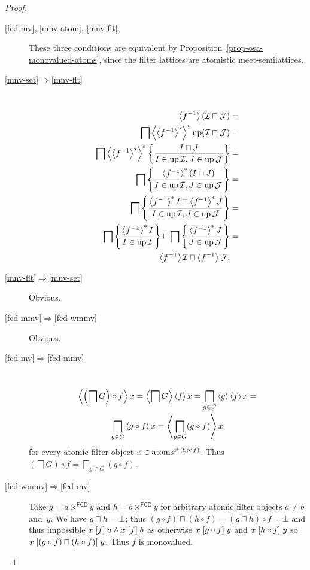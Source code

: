 \begin{proof}
~
\begin{description}
\item[\ref{fcd-mv}, \ref{mnv-atom}, \ref{mnv-flt}]
These three conditions are equivalent by
Proposition~\ref{prop-osa-monovalued-atoms}, since the filter
lattices are atomistic meet-semilattices.
\item [{\ref{mnv-set}$\Rightarrow$\ref{mnv-flt}}] ~
\begin{align*}
\left\langle f^{-1}\right\rangle(\mathcal{I}\sqcap\mathcal{J}) & =\\
\bigsqcap\left\langle \left\langle f^{-1}\right\rangle ^{\ast}\right\rangle ^{\ast}\operatorname{up}(\mathcal{I}\sqcap\mathcal{J}) & =\\
\bigsqcap\left\langle \left\langle f^{-1}\right\rangle ^{\ast}\right\rangle ^{\ast}\left\{ \frac{I\sqcap
J}{I\in\operatorname{up}\mathcal{I},J\in\operatorname{up}\mathcal{J}}\right\} & =\\
\bigsqcap\left\{ \frac{\left\langle f^{-1}\right\rangle ^{\ast}(I\sqcap J)}{I\in\operatorname{up}\mathcal{I},J\in\operatorname{up}\mathcal{J}}\right\}
& =\\
\bigsqcap\left\{ \frac{\left\langle f^{-1}\right\rangle ^{\ast}I\sqcap\left\langle f^{-1}\right\rangle ^{\ast}J}{I\in\operatorname{up}\mathcal{I},J\in\operatorname{up}\mathcal{J}}\right\} & =\\
\bigsqcap\left\{ \frac{\left\langle f^{-1}\right\rangle ^{\ast}I}{I\in\operatorname{up}\mathcal{I}}\right\}\sqcap\bigsqcap\left\{ \frac{\left\langle f^{-1}\right\rangle ^{\ast}J}{J\in\operatorname{up}\mathcal{J}}\right\}
& =\\
\left\langle f^{-1}\right\rangle\mathcal{I}\sqcap\left\langle f^{-1}\right\rangle\mathcal{J}.
\end{align*}

\item [{\ref{mnv-flt}$\Rightarrow$\ref{mnv-set}}] Obvious.
\item [{\ref{fcd-mmv}$\Rightarrow$\ref{fcd-wmmv}}] Obvious.
\item [{\ref{fcd-mv}$\Rightarrow$\ref{fcd-mmv}}] ~
\begin{multline*}
\left\langle \left(\bigsqcap G\right)\circ f\right\rangle x=\left\langle \bigsqcap
G\right\rangle\left\langle f\right\rangle x=\bigsqcap_{g\in G}\left\langle g\right\rangle\left\langle f\right\rangle x=\\\bigsqcap_{g\in
G}\left\langle g\circ f\right\rangle x=\left\langle \bigsqcap_{g\in G}(g\circ f)\right\rangle x
\end{multline*}
for every atomic filter object $x\in\operatorname{atoms}^{\mathscr{F}(\operatorname{Src} f)}$.
Thus $\left(\bigsqcap G\right)\circ f=\bigsqcap_{g\in G}(g\circ f)$.
\item [{\ref{fcd-wmmv}$\Rightarrow$\ref{fcd-mv}}] Take
$g=a\times^{\mathsf{FCD}}y$
and $h=b\times^{\mathsf{FCD}}y$ for arbitrary atomic filter objects
$a\ne b$ and~$y$. We have $g\sqcap h=\bot$; thus $(g\circ f)\sqcap(h\circ
f)=(g\sqcap h)\circ f=\bot$
and thus impossible $x\mathrel{\left[f\right]}a\land x\mathrel{\left[f\right]}b$ as otherwise $x\mathrel{\left[g\circ
f\right]}y$
and $x\mathrel{\left[h\circ f\right]}y$ so $x\mathrel{\left[(g\circ f)\sqcap(h\circ f)\right]}y$.
Thus $f$ is monovalued.
\end{description}
\end{proof}
